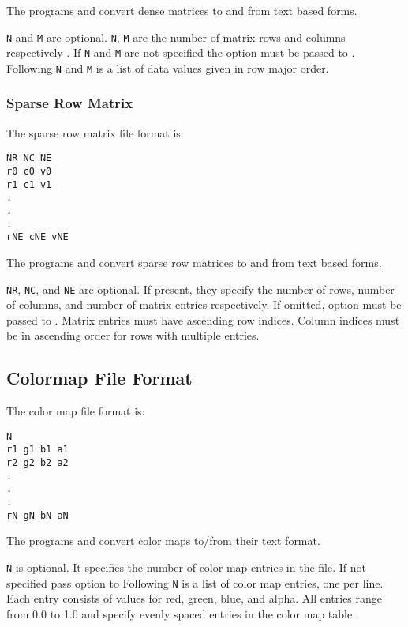 The programs  and  
convert dense matrices to and from text based forms.

\verb|N| and \verb|M| are optional.  \verb|N|, \verb|M| are the number
of matrix rows and columns respectively .  If \verb|N| and \verb|M|
are not specified the  option must be
passed to .  Following \verb|N| and
\verb|M| is a list of data values given in row major order.


\subsubsection{Sparse Row Matrix}

The sparse row matrix file format is:

\begin{verbatim}
NR NC NE
r0 c0 v0
r1 c1 v1
.
.
.
rNE cNE vNE
\end{verbatim}

The programs  and
 convert sparse row matrices to and from
text based forms.

\verb|NR|, \verb|NC|, and \verb|NE| are optional.  If present, they
specify the number of rows, number of columns, and number of matrix
entries respectively.  If omitted, option  must be passed to .
Matrix entries must have ascending row indices. Column indices must be
in ascending order for rows with multiple entries.

\subsection{Colormap File Format}
\label{sec:colormap_fmt}

The color map file format is:

\begin{verbatim}
N
r1 g1 b1 a1
r2 g2 b2 a2
.
.
.
rN gN bN aN
\end{verbatim}

The programs  and 
convert color maps to/from their text format.

\verb|N| is optional.  It specifies the number of color map entries in
the file.  If not specified pass option  to
  Following \verb|N| is a list of color map
entries, one per line.  Each entry consists of values for red, green,
blue, and alpha.  All entries range from 0.0 to 1.0 and specify 
evenly spaced entries in the color map table.


